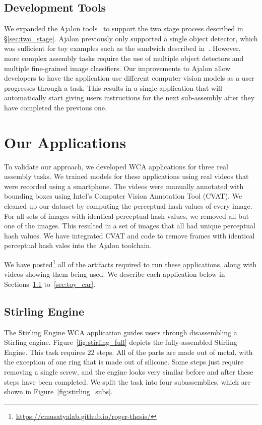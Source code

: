 \subsection{Development Tools}

We expanded the Ajalon tools~\cite{pham2021ajalon} to support the two stage
process described in \S\ref{sec:two_stage}.
Ajalon previously only supported a single object detector, which was sufficient
for toy examples such as the sandwich described in~\cite{chen2017}.
However, more complex assembly tasks require the use of multiple object
detectors and multiple fine-grained image classifiers.
Our improvements to Ajalon allow developers to have the application use
different computer vision models as a user progresses through a task.
This results in a single application that will automatically start
giving users instructions for the next sub-assembly after they have completed
the previous one.

\section{Our Applications}

To validate our approach, we developed WCA applications for three real assembly
tasks.
We trained models for these applications using real videos that were recorded
using a smartphone.
The videos were manually annotated with bounding boxes using Intel's Computer
Vision Annotation Tool (CVAT).
We cleaned up our dataset by computing the perceptual hash values of every
image.
For all sets of images with identical perceptual hash values, we removed all but
one of the images.
This resulted in a set of images that all had unique perceptual hash values.
We have integrated CVAT and code to remove frames with identical perceptual hash
vales into the Ajalon toolchain.

We have posted\footnote{\url{https://cmusatyalab.github.io/roger-thesis/}} all
of the
artifacts required to run these applications, along with videos showing them
being used.
We describe each application below in Sections~{\ref{sec:stirling}}
to~{\ref{sec:toy_car}}.

\subsection{Stirling Engine}\label{sec:stirling}

The Stirling Engine WCA application guides users through disassembling a
Stirling engine.
Figure~\ref{fig:stirling_full} depicts the fully-assembled Stirling Engine.
This task requires 22 steps. All of the parts are made out of
metal, with the exception of one ring that is made out of silicone. Some steps
just require removing a single screw, and the engine looks very similar before
and after these steps have been completed.
We split the task into four subassemblies, which are shown in
Figure~\ref{fig:stirling_subs}.

